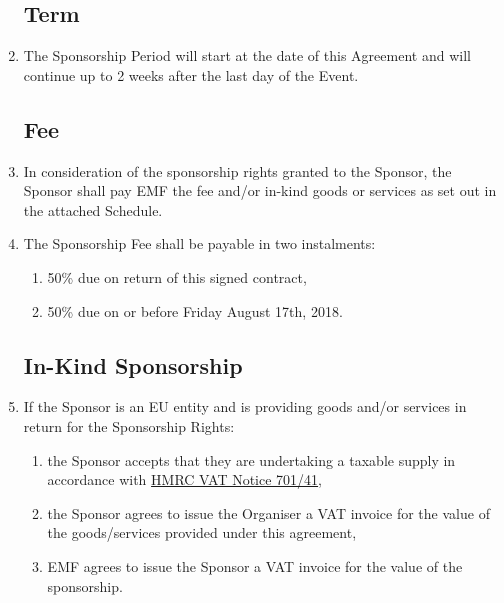 \begin{enumerate}
\subsection*{Term}

\item The Sponsorship Period will start at the date of this Agreement and will continue up to
2 weeks after the last day of the Event.

\subsection*{Fee}

\item In consideration of the sponsorship rights granted to the Sponsor, the Sponsor shall
pay EMF the fee and/or in-kind goods or services as set out in the attached Schedule.


\item The Sponsorship Fee shall be payable in two instalments:
\begin{enumerate}
    \item 50\% due on return of this signed contract,
    \item 50\% due on or before Friday August 17th, 2018.
\end{enumerate}

\subsection*{In-Kind Sponsorship}

\item If the Sponsor is an EU entity and is providing goods and/or services in return for the
      Sponsorship Rights:
\begin{enumerate}
      \item the Sponsor accepts that they are undertaking a taxable supply in accordance with
      \href{https://www.gov.uk/government/publications/vat-notice-70141-sponsorship/vat-notice-70141-sponsorship}{HMRC VAT Notice 701/41},
      \item the Sponsor agrees to issue the Organiser a VAT invoice for the value of the
            goods/services provided under this agreement,
      \item EMF agrees to issue the Sponsor a VAT invoice for the value of the sponsorship.
\end{enumerate}


\end{enumerate}
